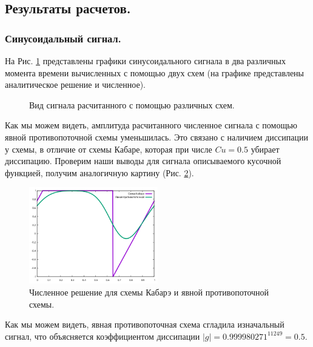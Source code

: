 \subsection{Результаты расчетов.}
\subsubsection{Синусоидальный сигнал.}
На Рис. \ref{fig:11} представлены графики синусоидального сигнала в два различных момента времени вычисленных с помощью двух схем (на графике представлены аналитическое решение и численное).

\begin{figure}[H]
    \centering
    \hfill
    \hfill
    \caption{Вид сигнала расчитанного с помощью различных схем.}
    \label{fig:11}
\end{figure}

Как мы можем видеть, амплитуда расчитанного численное сигнала с помощью явной противопоточной схемы уменьшилась. Это связано с наличием диссипации у схемы, в отличие от схемы Кабаре, которая при числе $Cu=0.5$ убирает диссипацию. 
Проверим наши выводы для сигнала описываемого кусочной функцией, получим аналогичную картину (Рис. \ref{fig:21}).

\begin{figure}[H]
    \centering
    \includegraphics[width=0.5\textwidth]{images/22.png}
    \caption{Численное решение для схемы Кабарэ и явной противопоточной схемы.}
    \label{fig:21}
\end{figure}
Как мы можем видеть, явная противопоточная схема сгладила изначальный сигнал, что объясняется коэффициентом диссипации $|g|=0.999980271^{11249}=0.5$.

